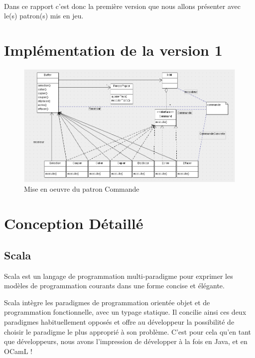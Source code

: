 \documentclass[a4paper,11pt]{article}
\begin{document}
\paragraph{}
Dans ce rapport c'est donc la première version que nous allons présenter avec le(s) patron(s) mis en jeu.

\section{Implémentation de la version 1}


\begin{figure}[!ht]
		\center
		\includegraphics [width=15cm]{Command.png}
		\caption{Mise en oeuvre du patron Commande}
\end{figure}




\section{Conception Détaillé}

\subsection{Scala}

Scala est un langage de programmation multi-paradigme pour exprimer les modèles de programmation courants dans une forme concise et élégante.

Scala intègre les paradigmes de programmation orientée objet et de programmation fonctionnelle, avec un typage statique. Il concilie ainsi ces deux paradigmes habituellement opposés et offre au développeur la possibilité de choisir le paradigme le plus approprié à son problème. C'est pour cela qu'en tant que développeurs, nous avons l'impression de développer à la fois en Java, et en OCamL !
\end{document}
